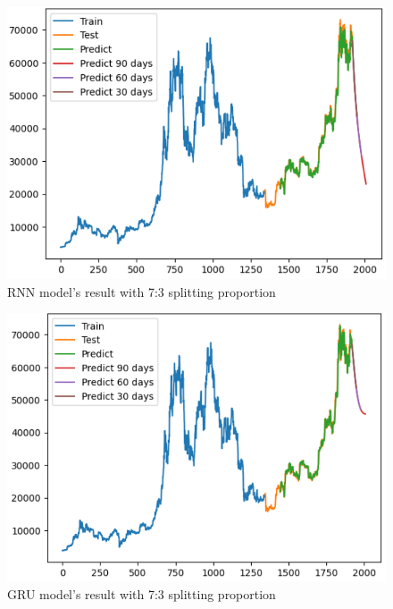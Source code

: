 \documentclass{ieeeojies}
\begin{document}
\begin{figure}[H]
	\centering
	\begin{minipage}{0.8\linewidth}
		\centering
		\includegraphics[width=\linewidth]{bibliography/Images/RNN_BTC_73.PNG}
		\caption{RNN model's result with 7:3 splitting proportion}
	\end{minipage}
\end{figure}
\begin{figure}[H]
	\centering
	\begin{minipage}{0.8\linewidth}
		\centering
		\includegraphics[width=\linewidth]{bibliography/Images/GRU_BTC_73.PNG}
		\caption{GRU model's result with 7:3 splitting proportion}
	\end{minipage}
\end{figure}
\end{document}
